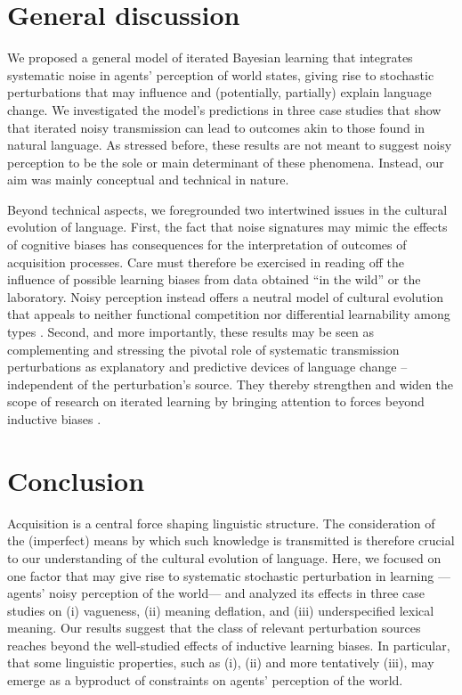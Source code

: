 \documentclass[10pt,a4paper]{article}
\begin{document}
\section{General discussion}
We proposed a general model of iterated Bayesian learning that integrates systematic noise in agents'
perception of world states, giving rise to stochastic perturbations that may influence and
(potentially, partially) explain language change. We investigated the model's predictions in
three case studies that show that iterated noisy transmission can lead to outcomes akin to
those found in natural language. As stressed before, these results are not meant to suggest
noisy perception to be the sole or main determinant of these phenomena. Instead, our aim was
mainly conceptual and technical in nature.

Beyond technical aspects, we foregrounded two intertwined issues in the cultural evolution of
language. First, the fact that noise signatures may mimic the effects of cognitive biases has
consequences for the interpretation of outcomes of acquisition processes. Care must
therefore be exercised in reading off the influence of possible learning biases from
data obtained ``in the wild'' or the laboratory. Noisy perception instead offers a neutral
model of cultural evolution that appeals to neither functional
competition nor differential learnability among types \citep{reali+griffiths:2009}. Second, and more importantly, these results
may be seen as complementing and stressing the pivotal role of systematic transmission
perturbations as explanatory and predictive devices of language change -- independent of the
perturbation's source. They thereby strengthen and widen the scope of research on iterated
learning by bringing attention to forces beyond inductive biases \citep[cf.][]{perfors+navarro:2014}.


\section{Conclusion}
Acquisition is a central force shaping linguistic structure. The consideration of the
(imperfect) means by which such knowledge is transmitted is therefore crucial to our
understanding of the cultural evolution of language. Here, we focused on one factor that may
give rise to systematic stochastic perturbation in learning ---agents' noisy perception of the
world--- and analyzed its effects in three case studies on (i) vagueness, (ii) meaning
deflation, and (iii) underspecified lexical meaning. Our results suggest that the class of
relevant perturbation sources reaches beyond the well-studied effects of inductive learning
biases. In particular, that some linguistic properties, such as (i), (ii) and more tentatively
(iii), may emerge as a byproduct of constraints on agents' perception of the world.
\end{document}

